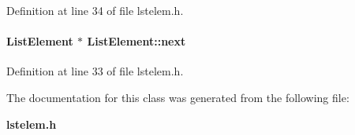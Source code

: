 Definition at line 34 of file lstelem.h.\label{ListElement_o0}
\paragraph{\setlength{\rightskip}{0pt plus 5cm}List\-Element $\ast$ List\-Element::next\hspace{0.3cm}{\tt  [private]}}\hfill



Definition at line 33 of file lstelem.h.

The documentation for this class was generated from the following file:\begin{CompactItemize}
\item 
{\bf lstelem.h}\end{CompactItemize}
